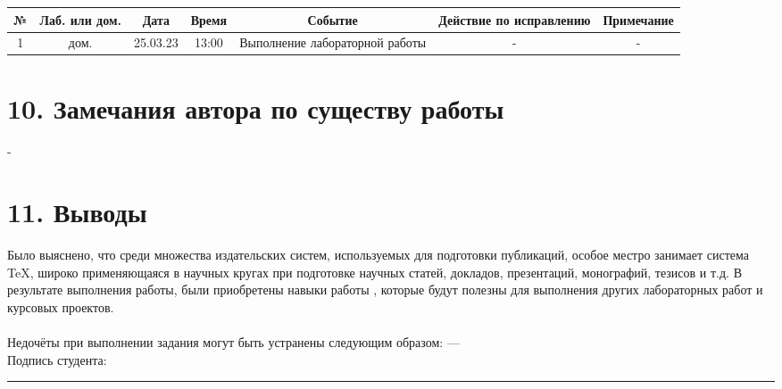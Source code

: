 \documentclass[a4paper]{report} %
\begin{document}
\begin{tabular}{ | c | c | c | c | c | c | c | }
\hline
№ & Лаб. или дом. & Дата & Время & Событие & Действие по исправлению & Примечание \\
\hline
1 & дом. & 25.03.23 & 13:00 & Выполнение лабораторной работы & - & - \\
\hline
\end{tabular}

\section*{10. Замечания автора по существу работы}
-
\section*{11. Выводы}

Было выяснено, что среди множества издательских систем, используемых для подготовки публикаций, особое местро занимает система TeX, широко применяющаяся в научных кругах при подготовке научных статей, докладов, презентаций, монографий, тезисов и т.д. В результате выполнения работы, были приобретены навыки работы , которые будут полезны для выполнения других лабораторных работ и курсовых проектов.
\\
\\
Недочёты при выполнении задания могут быть устранены следующим образом: —
\\
Подпись студента: \rule{60}{0.03}

\thispagestyle{empty}
\end{document}
